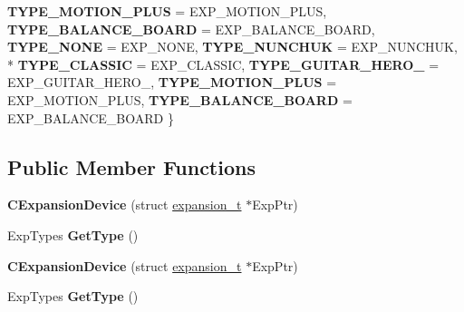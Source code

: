 \begin{DoxyCompactItemize}
{\bfseries T\-Y\-P\-E\-\_\-\-M\-O\-T\-I\-O\-N\-\_\-\-P\-L\-U\-S} =  E\-X\-P\-\_\-\-M\-O\-T\-I\-O\-N\-\_\-\-P\-L\-U\-S, 
{\bfseries T\-Y\-P\-E\-\_\-\-B\-A\-L\-A\-N\-C\-E\-\_\-\-B\-O\-A\-R\-D} =  E\-X\-P\-\_\-\-B\-A\-L\-A\-N\-C\-E\-\_\-\-B\-O\-A\-R\-D, 
{\bfseries T\-Y\-P\-E\-\_\-\-N\-O\-N\-E} =  E\-X\-P\-\_\-\-N\-O\-N\-E, 
{\bfseries T\-Y\-P\-E\-\_\-\-N\-U\-N\-C\-H\-U\-K} =  E\-X\-P\-\_\-\-N\-U\-N\-C\-H\-U\-K, 
\\*
{\bfseries T\-Y\-P\-E\-\_\-\-C\-L\-A\-S\-S\-I\-C} =  E\-X\-P\-\_\-\-C\-L\-A\-S\-S\-I\-C, 
{\bfseries T\-Y\-P\-E\-\_\-\-G\-U\-I\-T\-A\-R\-\_\-\-H\-E\-R\-O\-\_} =  E\-X\-P\-\_\-\-G\-U\-I\-T\-A\-R\-\_\-\-H\-E\-R\-O\-\_, 
{\bfseries T\-Y\-P\-E\-\_\-\-M\-O\-T\-I\-O\-N\-\_\-\-P\-L\-U\-S} =  E\-X\-P\-\_\-\-M\-O\-T\-I\-O\-N\-\_\-\-P\-L\-U\-S, 
{\bfseries T\-Y\-P\-E\-\_\-\-B\-A\-L\-A\-N\-C\-E\-\_\-\-B\-O\-A\-R\-D} =  E\-X\-P\-\_\-\-B\-A\-L\-A\-N\-C\-E\-\_\-\-B\-O\-A\-R\-D
 \}
\end{DoxyCompactItemize}
\subsection*{Public Member Functions}
\begin{DoxyCompactItemize}
\item 
\hypertarget{class_c_expansion_device_a68809e7c5c3736cc307e48630a7168a0}{{\bfseries C\-Expansion\-Device} (struct \hyperlink{structexpansion__t}{expansion\-\_\-t} $\ast$Exp\-Ptr)}\label{class_c_expansion_device_a68809e7c5c3736cc307e48630a7168a0}

\item 
\hypertarget{class_c_expansion_device_afe34f8c67883e2283b87332aed1b372f}{Exp\-Types {\bfseries Get\-Type} ()}\label{class_c_expansion_device_afe34f8c67883e2283b87332aed1b372f}

\item 
\hypertarget{class_c_expansion_device_a68809e7c5c3736cc307e48630a7168a0}{{\bfseries C\-Expansion\-Device} (struct \hyperlink{structexpansion__t}{expansion\-\_\-t} $\ast$Exp\-Ptr)}\label{class_c_expansion_device_a68809e7c5c3736cc307e48630a7168a0}

\item 
\hypertarget{class_c_expansion_device_a0e3a2a6567e08456def2692c608a9e11}{Exp\-Types {\bfseries Get\-Type} ()}\label{class_c_expansion_device_a0e3a2a6567e08456def2692c608a9e11}

\end{DoxyCompactItemize}
